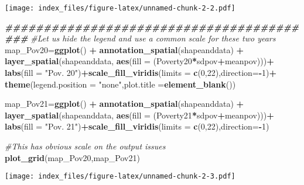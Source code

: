 \documentclass[
]{article}
\newenvironment{Shaded}{\begin{snugshade}}{\end{snugshade}}
\newcommand{\AttributeTok}[1]{\textcolor[rgb]{0.13,0.29,0.53}{#1}}
\newcommand{\CommentTok}[1]{\textcolor[rgb]{0.56,0.35,0.01}{\textit{#1}}}
\newcommand{\DecValTok}[1]{\textcolor[rgb]{0.00,0.00,0.81}{#1}}
\newcommand{\DocumentationTok}[1]{\textcolor[rgb]{0.56,0.35,0.01}{\textbf{\textit{#1}}}}
\newcommand{\FunctionTok}[1]{\textcolor[rgb]{0.13,0.29,0.53}{\textbf{#1}}}
\newcommand{\NormalTok}[1]{#1}
\newcommand{\OtherTok}[1]{\textcolor[rgb]{0.56,0.35,0.01}{#1}}
\newcommand{\SpecialCharTok}[1]{\textcolor[rgb]{0.81,0.36,0.00}{\textbf{#1}}}
\newcommand{\StringTok}[1]{\textcolor[rgb]{0.31,0.60,0.02}{#1}}
\begin{document}
\texttt{[image: index\_files/figure-latex/unnamed-chunk-2-2.pdf]}

\begin{Shaded}
\begin{Highlighting}[]
\DocumentationTok{\#\#\#\#\#\#\#\#\#\#\#\#\#\#\#\#\#\#\#\#\#\#\#\#\#\#\#\#\#\#\#\#\#\#\#\#\#\#\#\#\#}
\CommentTok{\#Let us hide the legend and use a common scale for these two years}
\NormalTok{map\_Pov20}\OtherTok{=}\FunctionTok{ggplot}\NormalTok{() }\SpecialCharTok{+}
  \FunctionTok{annotation\_spatial}\NormalTok{(shapeanddata) }\SpecialCharTok{+}
  \FunctionTok{layer\_spatial}\NormalTok{(shapeanddata, }\FunctionTok{aes}\NormalTok{(}\AttributeTok{fill =}\NormalTok{ (Poverty20}\SpecialCharTok{*}\NormalTok{sdpov}\SpecialCharTok{+}\NormalTok{meanpov)))}\SpecialCharTok{+}
  \FunctionTok{labs}\NormalTok{(}\AttributeTok{fill =} \StringTok{"Pov. 20"}\NormalTok{)}\SpecialCharTok{+}\FunctionTok{scale\_fill\_viridis}\NormalTok{(}\AttributeTok{limits =} \FunctionTok{c}\NormalTok{(}\DecValTok{0}\NormalTok{,}\DecValTok{22}\NormalTok{),}\AttributeTok{direction=}\SpecialCharTok{{-}}\DecValTok{1}\NormalTok{)}\SpecialCharTok{+}
  \FunctionTok{theme}\NormalTok{(}\AttributeTok{legend.position =} \StringTok{"none"}\NormalTok{,}\AttributeTok{plot.title =}\FunctionTok{element\_blank}\NormalTok{())}


\NormalTok{map\_Pov21}\OtherTok{=}\FunctionTok{ggplot}\NormalTok{() }\SpecialCharTok{+}
  \FunctionTok{annotation\_spatial}\NormalTok{(shapeanddata) }\SpecialCharTok{+}
  \FunctionTok{layer\_spatial}\NormalTok{(shapeanddata, }\FunctionTok{aes}\NormalTok{(}\AttributeTok{fill =}\NormalTok{ (Poverty21}\SpecialCharTok{*}\NormalTok{sdpov}\SpecialCharTok{+}\NormalTok{meanpov)))}\SpecialCharTok{+}
  \FunctionTok{labs}\NormalTok{(}\AttributeTok{fill =} \StringTok{"Pov. 21"}\NormalTok{)}\SpecialCharTok{+}\FunctionTok{scale\_fill\_viridis}\NormalTok{(}\AttributeTok{limits =} \FunctionTok{c}\NormalTok{(}\DecValTok{0}\NormalTok{,}\DecValTok{22}\NormalTok{),}\AttributeTok{direction=}\SpecialCharTok{{-}}\DecValTok{1}\NormalTok{)}

\CommentTok{\#This has obvious scale on the output issues }
\FunctionTok{plot\_grid}\NormalTok{(map\_Pov20,map\_Pov21)}
\end{Highlighting}
\end{Shaded}

\texttt{[image: index\_files/figure-latex/unnamed-chunk-2-3.pdf]}
\end{document}
